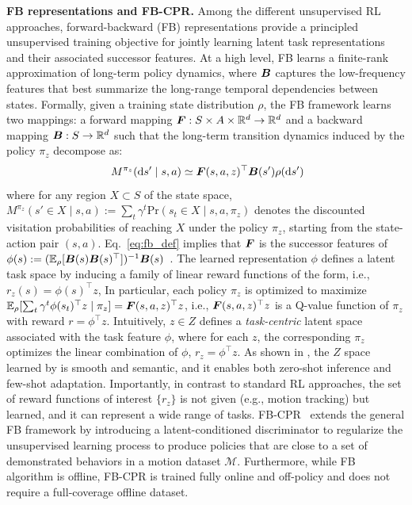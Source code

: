 \textbf{FB representations and FB-CPR.} Among the different unsupervised RL approaches, forward-backward (FB) representations provide a principled unsupervised training objective for jointly learning latent task representations and their associated successor features. At a high level, FB learns a finite-rank approximation of long-term policy dynamics, where $\boldsymbol{B}$ captures the low-frequency features that best summarize the long-range temporal dependencies between states.  Formally, given a training state distribution $\rho$, the FB framework learns two mappings: a forward mapping $\boldsymbol{F}: S \times A \times \mathbb{R}^d \rightarrow \mathbb{R}^d$ and a backward mapping $\boldsymbol{B}: S \rightarrow \mathbb{R}^d$ such that the long-term transition dynamics induced by the policy $\pi_z$ decompose as:
\begin{equation}~\label{eq:fb_def}
    M^{\pi_z}(\mathrm{d}s' \mid s, a) \simeq \boldsymbol{F}(s, a, z)^\top \boldsymbol{B}(s') \rho(\mathrm{d}s')
\end{equation}
where for any region $X \subset S$ of the state space, $M^{\pi_z}(s' \in X \mid s, a) := \sum_{t} \gamma^t \mathrm{Pr}(s_t \in X \mid s, a, \pi_z)$ denotes the discounted visitation probabilities of reaching $X$ under the policy $\pi_z$, starting from the state-action pair $(s, a)$. Eq.~\ref{eq:fb_def} implies that $\boldsymbol{F}$ is the successor features of $\phi(s) := ( \mathbb{E}_{\rho}[\boldsymbol{B}(s) \boldsymbol{B}(s)^\top])^{-1} \boldsymbol{B}(s)$~\citep{touatizerorl}.
The learned representation $\phi$ defines a latent task space by inducing a family of linear reward functions of the form, i.e., $r_z(s) = \phi(s)^\top z$, In particular, each policy $\pi_z$ is optimized to maximize $\mathbb{E}_{\rho}[\sum_t \gamma^t \phi(s_t)^\top z \mid \pi_z] = \boldsymbol{F}(s,a,z)^\top z$, i.e., $\boldsymbol{F}(s,a,z)^\top z$ is a Q-value function of $\pi_z$ with reward $r=\phi^\top z$. Intuitively, $z \in Z$ defines a \emph{task-centric} latent space associated with the task feature $\phi$, where for each $z$, the corresponding $\pi_z$ optimizes the linear combination of $\phi$, $r_z=\phi^\top z$. As shown in , the $Z$ space learned by \method{} is smooth and semantic, and it enables both zero-shot inference and few-shot adaptation. Importantly, in contrast to standard RL approaches, the set of reward functions of interest $\{r_z\}$ is not given (e.g., motion tracking) but learned, and it can represent a wide range of tasks. 
%
FB-CPR~\citep{TirinzoniTFGKXL25zeroshot} extends the general FB framework by introducing a latent-conditioned discriminator to regularize the unsupervised learning process to produce policies that are close to a set of demonstrated behaviors in a motion dataset $\mathcal{M}$. Furthermore, while FB algorithm is offline, FB-CPR is trained fully online and off-policy and does not require a full-coverage offline dataset.
